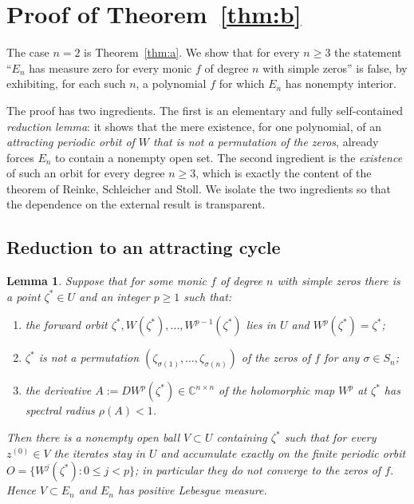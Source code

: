 \documentclass{amsart}
\newtheorem{lemma}{Lemma}
\theoremstyle{definition}
\theoremstyle{remark}
\newcommand{\C}{\mathbb{C}}
\begin{document}
\section{Proof of Theorem~\ref{thm:b}}

The case $n=2$ is Theorem~\ref{thm:a}. We show that for every $n\ge3$ the statement
``$E_n$ has measure zero for every monic $f$ of degree $n$ with simple zeros'' is false, by
exhibiting, for each such $n$, a polynomial $f$ for which $E_n$ has nonempty interior.

The proof has two ingredients. The first is an elementary and fully self-contained
\emph{reduction lemma}: it shows that the mere existence, for one polynomial, of an
\emph{attracting periodic orbit of $W$ that is not a permutation of the zeros}, already forces
$E_n$ to contain a nonempty open set. The second ingredient is the \emph{existence} of such an
orbit for every degree $n\ge3$, which is exactly the content of the theorem of
Reinke, Schleicher and Stoll. We isolate the two ingredients so that the dependence on the
external result is transparent.

\subsection{Reduction to an attracting cycle}

\begin{lemma}\label{lem:attr}
Suppose that for some monic $f$ of degree $n$ with simple zeros there is a point
$\zeta^{*}\in U$ and an integer $p\ge1$ such that:
\begin{enumerate}
\item the forward orbit $\zeta^{*},W(\zeta^{*}),\dots,W^{p-1}(\zeta^{*})$ lies in $U$ and
$W^{p}(\zeta^{*})=\zeta^{*}$;
\item $\zeta^{*}$ is \emph{not} a permutation
$(\zeta_{\sigma(1)},\dots,\zeta_{\sigma(n)})$ of the zeros of $f$ for any $\sigma\in S_n$;
\item the derivative $A:=DW^{p}(\zeta^{*})\in\C^{n\times n}$ of the holomorphic map $W^{p}$
at $\zeta^{*}$ has spectral radius $\rho(A)<1$.
\end{enumerate}
Then there is a nonempty open ball $V\subset U$ containing $\zeta^{*}$ such that for every
$z^{(0)}\in V$ the iterates stay in $U$ and accumulate exactly on the finite periodic orbit
$O=\{W^{j}(\zeta^{*}):0\le j<p\}$; in particular they do not converge to the zeros of $f$.
Hence $V\subset E_n$ and $E_n$ has positive Lebesgue measure.
\end{lemma}
\end{document}
